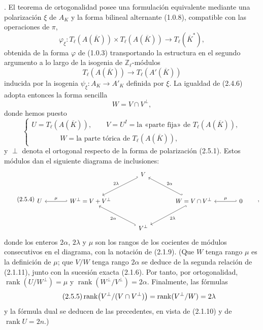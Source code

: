 \par\medskip
{}. El teorema de ortogonalidad posee una formulación equivalente
mediante una polarización $\xi$ de $A_K$ y la forma bilineal alternante
(1.0.8), compatible con las operaciones de $\pi$,
\begin{equation}\tag{2.5.1}
 \varphi_\xi:T_\ell(A(\overline K))\times T_\ell(A(\overline K))
 \longrightarrow T_\ell(\overline K^*),
\end{equation}
obtenida de la forma $\varphi$ de (1.0.3) transportando la estructura
en el segundo argumento a lo largo de la isogenia de
$\mathbb Z_\ell$-módulos
\[
 T_\ell(A(\overline K))\longrightarrow T_\ell(A'(\overline K))
\]
inducida por la isogenia $\psi_\xi:A_K\longrightarrow A'_K$ definida
por $\xi$. La igualdad de (2.4.6) adopta entonces la forma sencilla
\begin{equation}\tag{2.5.2}
 W=V\cap V^\perp,
\end{equation}
donde hemos puesto
\begin{equation}\tag{2.5.3}
 \left\{
 \begin{array}{l}
 U=T_\ell(A(\overline K)),\qquad
 V=U^I=\text{la «parte fija» de }T_\ell(A(\overline K)),\\[2mm]
 \hspace{4em}W=\text{la parte tórica de }T_\ell(A(\overline K)),
 \end{array}
 \right.
\end{equation}
y $\perp$ denota el ortogonal respecto de la forma de polarización
(2.5.1). Estos módulos dan el siguiente diagrama de inclusiones:
\begin{equation}\tag{2.5.4}
\begin{tikzcd}[column sep=large,row sep=large]
 && V\arrow[dl,hook',"2\lambda"'] && \\
 U & W^\perp=V+V^\perp\arrow[l,hook',"\mu"']
 && W=V\cap V^\perp
    \arrow[ul,hook',"2\alpha"']
    \arrow[dl,hook,"2\lambda"]
 & 0\arrow[l,hook',"\mu"'] \\
 && V^\perp\arrow[ul,hook,"2\alpha"] &&
\end{tikzcd}
\qquad ,
\end{equation}
donde los enteros $2\alpha$, $2\lambda$ y $\mu$ son los rangos de los
cocientes de módulos consecutivos en el diagrama, con la notación de
(2.1.9). (Que $W$ tenga rango $\mu$ es la definición de $\mu$; que
$V/W$ tenga rango $2\alpha$ se deduce de la segunda relación de
(2.1.11), junto con la sucesión exacta (2.1.6). Por tanto, por
ortogonalidad, $\operatorname{rank}(U/W^\perp)=\mu$ y
$\operatorname{rank}(W^\perp/V^\perp)=2\alpha$. Finalmente, las
fórmulas
\begin{equation}\tag{2.5.5}
 \operatorname{rank}\bigl(\sisi{V}{V^\perp}/(V\cap V^\perp)\bigr)
 =\operatorname{rank}(\sisi{V}{V^\perp}/W)=2\lambda
\end{equation}
y la fórmula dual se deducen de las precedentes, en vista de (2.1.10)
y de $\operatorname{rank}U=2n$.)

